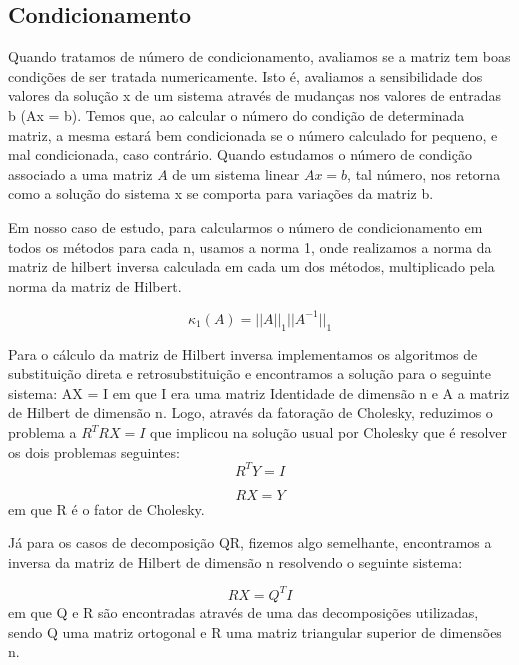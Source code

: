\documentclass[12pt, a4paper]{article}
\begin{document}
\subsection{Condicionamento}

Quando tratamos de número de condicionamento, avaliamos se a matriz tem boas condições de ser tratada numericamente. Isto é, avaliamos a sensibilidade dos valores da solução x de um sistema através de mudanças nos valores de entradas b (Ax = b). Temos que, ao calcular o número do condição de determinada matriz, a mesma estará bem condicionada se o número calculado for pequeno, e mal condicionada, caso contrário. Quando estudamos o número de condição associado a uma matriz $A$ de um sistema linear $Ax = b$, tal número, nos retorna como a solução do sistema x se comporta para variações da matriz b.


Em nosso caso de estudo, para calcularmos o número de condicionamento em todos os métodos para cada n, usamos a norma 1, onde realizamos a norma da matriz de hilbert inversa calculada em cada um dos métodos, multiplicado pela norma da matriz de Hilbert.

\begin{equation}
    \kappa_1(A) = ||A||_1 ||A^{-1}||_1
\end{equation}

Para o cálculo da matriz de Hilbert inversa implementamos os algoritmos de substituição direta e retrosubstituição e encontramos a solução para o seguinte sistema:
AX = I em que I era uma matriz Identidade de dimensão n e A a matriz de Hilbert de dimensão n. Logo, através da fatoração de Cholesky, reduzimos o problema a $R^{T}RX = I$ que implicou na solução usual por Cholesky que é resolver os dois problemas seguintes:
\begin{equation}
    R^{T}Y = I 
\end{equation}

\begin{equation}
    RX = Y
\end{equation}
em que R é o fator de Cholesky.

Já para os casos de decomposição QR, fizemos algo semelhante, encontramos a inversa da matriz de Hilbert de dimensão n resolvendo o seguinte sistema:

\begin{equation}
   RX = Q^{T}I
\end{equation}
em que Q e R são encontradas através de uma das decomposições utilizadas, sendo Q uma matriz ortogonal e R uma matriz triangular superior de dimensões n.
\end{document}
